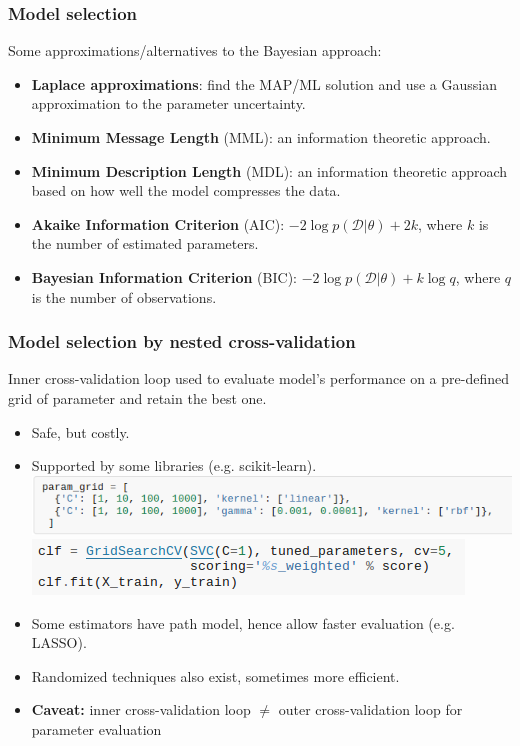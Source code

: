 \begin{frame}
\frametitle{Model selection}
Some approximations/alternatives to the Bayesian approach:
\begin{itemize}
\item {\bf Laplace approximations}: find the MAP/ML solution and use a Gaussian approximation to the parameter uncertainty.
\item {\bf Minimum Message Length} (MML): an information theoretic approach.
\item {\bf Minimum Description Length} (MDL): an information theoretic approach based on how well the model compresses the data.
\item {\bf Akaike Information Criterion} (AIC): $-2\log p(\mathcal{D}|\theta) + 2 k$, where $k$ is the number of estimated parameters.
\item {\bf Bayesian Information Criterion} (BIC): $-2\log p(\mathcal{D}|\theta) + k\log q$, where $q$ is the number of observations.
\end{itemize}
\end{frame}

\begin{frame}
\frametitle{Model selection by nested cross-validation}

Inner cross-validation loop used to evaluate model's performance on a
pre-defined grid of parameter and retain the best one.

\begin{itemize}
\item Safe, but costly.
\item Supported by some libraries (e.g. scikit-learn).
\includegraphics[width=\textwidth]{sklearn_material/grid}\\
\includegraphics[width=.65\textwidth]{sklearn_material/grid_search}
\item Some estimators have path model, hence allow faster evaluation
  (e.g. LASSO).
\item Randomized techniques also exist, sometimes more efficient.
\item \textbf{Caveat:} inner cross-validation loop $\neq$ outer
  cross-validation loop for parameter evaluation
\end{itemize}
\end{frame} 

